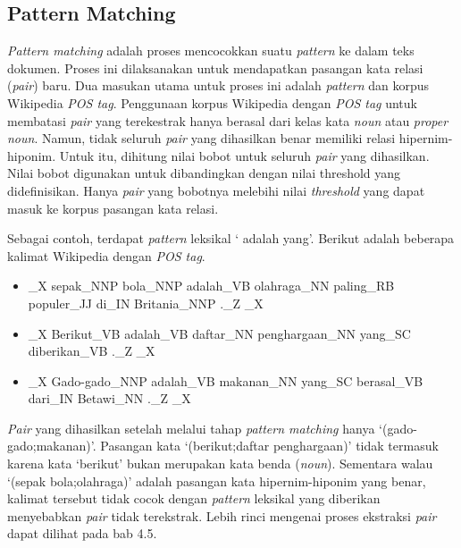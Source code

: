 \subsection{Pattern Matching}
\textit{Pattern matching} adalah proses mencocokkan suatu \textit{pattern} ke dalam teks dokumen. Proses ini dilaksanakan untuk mendapatkan pasangan kata relasi (\textit{pair}) baru. Dua masukan utama untuk proses ini adalah \textit{pattern} dan korpus Wikipedia \textit{POS tag}. Penggunaan korpus Wikipedia dengan \textit{POS tag} untuk membatasi \textit{pair} yang terekestrak hanya berasal dari kelas kata \textit{noun} atau \textit{proper noun}. Namun, tidak seluruh \textit{pair} yang dihasilkan benar memiliki relasi hipernim-hiponim. Untuk itu, dihitung nilai bobot untuk seluruh \textit{pair} yang dihasilkan. Nilai bobot digunakan untuk dibandingkan dengan nilai threshold yang didefinisikan. Hanya \textit{pair} yang bobotnya melebihi nilai \textit{threshold} yang dapat masuk ke korpus pasangan kata relasi.

Sebagai contoh, terdapat \textit{pattern} leksikal `{\tagHyponym} adalah {\tagHypernym} yang'. Berikut adalah beberapa kalimat Wikipedia dengan \textit{POS tag}.

\begin{itemize}
  \item {\tagStart}\_X sepak\_NNP bola\_NNP adalah\_VB olahraga\_NN paling\_RB populer\_JJ di\_IN Britania\_NNP .\_Z {\tagEnd}\_X
  \item {\tagStart}\_X Berikut\_VB adalah\_VB daftar\_NN penghargaan\_NN yang\_SC diberikan\_VB .\_Z {\tagEnd}\_X
  \item {\tagStart}\_X Gado-gado\_NNP adalah\_VB makanan\_NN yang\_SC berasal\_VB dari\_IN Betawi\_NN .\_Z {\tagEnd}\_X
\end{itemize}

\textit{Pair} yang dihasilkan setelah melalui tahap \textit{pattern matching} hanya `(gado-gado;makanan)'. Pasangan kata `(berikut;daftar penghargaan)' tidak termasuk karena kata `berikut' bukan merupakan kata benda (\textit{noun}). Sementara walau `(sepak bola;olahraga)' adalah pasangan kata hipernim-hiponim yang benar, kalimat tersebut tidak cocok dengan \textit{pattern} leksikal yang diberikan menyebabkan \textit{pair} tidak terekstrak. Lebih rinci mengenai proses ekstraksi \textit{pair} dapat dilihat pada bab 4.5.

